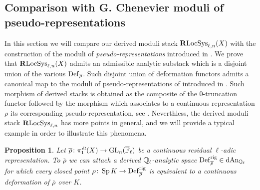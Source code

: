\documentclass[10pt,a4paper]{amsart}
\numberwithin{equation}{subsection}
\theoremstyle{plain}
\newtheorem{prop}[theorem]{Proposition}
\theoremstyle{definition}
\theoremstyle{remark}
\numberwithin{equation}{section}
\begin{document}
\subsection{Comparison with G. Chenevier moduli of pseudo-representations} In this section we will compare our derived moduli stack $\mathbf R \mathrm{LocSys}_{\ell, n}(X)$ with the construction of the moduli of \emph{pseudo-representations} introduced in \cite{chenevier}.
We prove that $\mathbf R \mathrm{LocSys}_{\ell, n}(X)$ admits an admissible analytic substack which is a disjoint union of the various $\mathbf{\mathrm{Def}}_{\overline{\rho}}$.
Such disjoint union of deformation functors admits a canonical map to the moduli of pseudo-representations of introduced in \cite{chenevier}. Such morphism of derived stacks is obtained as the composite of the $0$-truncation functor 
followed by the morphism which associates to a continuous representation $\rho $ its corresponding pseudo-representation, see \cite[Definition 1.5]{chenevier}. Neverthless, the derived moduli stack $\mathbf R \mathrm{LocSys}_{\ell, n}$
has more points in general, and we will provide a typical example in order to illustrate this phenomena.



\begin{prop} \label{moc}
Let $\overline{\rho} \colon \pi_1^{\emph{\text{\'et}}}(X) \to \mathrm{GL}_n(\overline{\mathbb F}_\ell)$ be a continuous residual $\ell$-adic representation.
To $\overline{\rho}$ we can attach a derived $\mathbb{Q}_\ell$-analytic space $\mathbf{\mathrm{Def}}_{\overline{ \rho}}^{\mathrm{rig} } \in \mathrm{dAn}_{\mathbb{Q}_\ell}$ for which every closed point $\rho \colon \operatorname{Sp} K \to \mathbf{\mathrm{Def}}_{\overline{\rho}}^{\mathrm{rig}}$ is equivalent to a continuous deformation of $\overline{\rho}$ over
$K$.
\end{prop}
\end{document}
